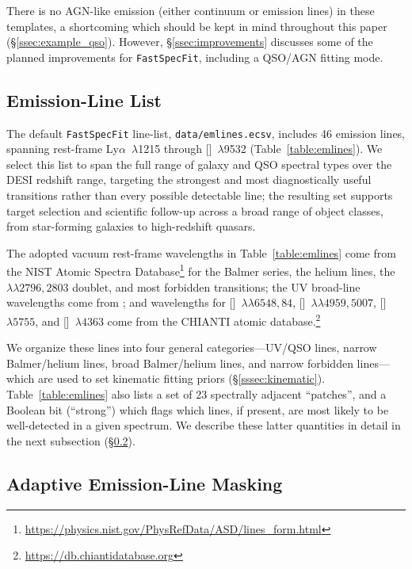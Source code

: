\documentclass[modern,linenumbers]{aastex702}
\newcommand{\fastspecfit}{\texttt{FastSpecFit}}
\newcommand{\oiii}{[\ion{O}{3}]}
\newcommand{\nii}{[\ion{N}{2}]}
\newcommand{\mgiidoublet}{\ion{Mg}{2}~$\lambda\lambda2796,2803$}
\newcommand{\oiiidoublet}{[\ion{O}{3}]~$\lambda\lambda4959,5007$}
\newcommand{\niidoublet}{[\ion{N}{2}]~$\lambda\lambda6548,84$}
\begin{document}
There is no AGN-like emission (either continuum or emission lines) in
these templates, a shortcoming which should be kept in mind throughout
this paper (\S\ref{ssec:example_qso}). However,
\S\ref{ssec:improvements} discusses some of the planned improvements
for \fastspecfit, including a QSO/AGN fitting mode.

\subsection{Emission-Line List}
\label{ssec:emlinelist}

The default \fastspecfit{} line-list, \texttt{data/emlines.ecsv},
includes 46 emission lines, spanning rest-frame
Ly$\alpha$~$\lambda$1215 through []~$\lambda$9532
(Table~\ref{table:emlines}). We select this list to span the full range
of galaxy and QSO spectral types over the DESI redshift range,
targeting the strongest and most diagnostically useful transitions
rather than every possible detectable line; the resulting set supports
target selection and scientific follow-up across a broad range of
object classes, from star-forming galaxies to high-redshift
quasars.

The adopted vacuum rest-frame wavelengths in Table~\ref{table:emlines}
come from the NIST Atomic Spectra
Database\footnote{\url{https://physics.nist.gov/PhysRefData/ASD/lines_form.html}}
for the Balmer series, the helium lines, the \mgiidoublet{} doublet,
and most forbidden transitions; the UV broad-line wavelengths come
from \citet{vanden-berk01a}; and wavelengths for \niidoublet,
\oiiidoublet, \nii~$\lambda5755$, and \oiii~$\lambda4363$ come from
the CHIANTI atomic
database.\footnote{\url{https://db.chiantidatabase.org}}

We organize these lines into four general categories---UV/QSO lines,
narrow Balmer/helium lines, broad Balmer/helium lines, and narrow
forbidden lines---which are used to set kinematic fitting priors
(\S\ref{sssec:kinematic}). Table~\ref{table:emlines} also lists a set
of 23 spectrally adjacent ``patches'', and a Boolean bit (``strong'')
which flags which lines, if present, are most likely to be
well-detected in a given spectrum. We describe these latter quantities
in detail in the next subsection (\S\ref{ssec:patches}).



\subsection{Adaptive Emission-Line Masking}
\label{ssec:patches}
\end{document}
